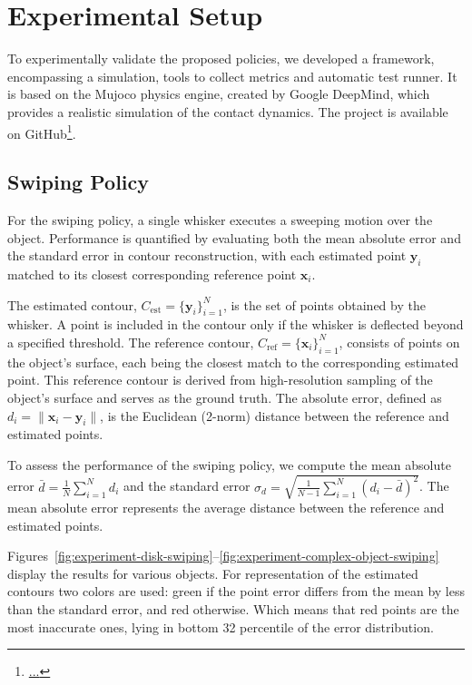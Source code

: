 

\chapter{Experimental Setup}

To experimentally validate the proposed policies, we developed a framework, encompassing a simulation, tools to collect metrics and automatic test runner.
It is based on the Mujoco physics engine, created by Google DeepMind, which provides a realistic simulation of the contact dynamics.
The project is available on GitHub\footnote{\url{...}}.


\section{Swiping Policy}
For the swiping policy, a single whisker executes a sweeping motion over the object.
Performance is quantified by evaluating both the mean absolute error and the standard error in contour reconstruction, with each estimated point $\mathbf{y}_i$ matched to its closest corresponding reference point $\mathbf{x}_i$.

The estimated contour, $C_{\text{est}} = \{\mathbf{y}_i\}_{i=1}^N$, is the set of points obtained by the whisker.
A point is included in the contour only if the whisker is deflected beyond a specified threshold.
The reference contour, $C_{\text{ref}} = \{\mathbf{x}_i\}_{i=1}^N$, consists of points on the object's surface, each being the closest match to the corresponding estimated point.
This reference contour is derived from high-resolution sampling of the object's surface and serves as the ground truth.
The absolute error, defined as $d_i = \|\mathbf{x}_i - \mathbf{y}_i\|$, is the Euclidean (2-norm) distance between the reference and estimated points.

To assess the performance of the swiping policy, we compute the mean absolute error $\bar{d} = \frac{1}{N}\sum_{i=1}^{N} d_i$ and the standard error $\sigma_d = \sqrt{\frac{1}{N-1}\sum_{i=1}^{N} (d_i - \bar{d})^2}$.
The mean absolute error represents the average distance between the reference and estimated points.

Figures~\ref{fig:experiment-disk-swiping}--\ref{fig:experiment-complex-object-swiping} display the results for various objects.
For representation of the estimated contours two colors are used: green if the point error differs from the mean by less than the standard error, and red otherwise.
Which means that red points are the most inaccurate ones, lying in bottom 32 percentile of the error distribution.

